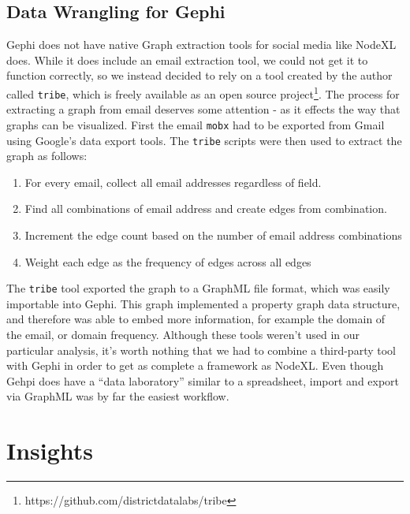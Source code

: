 \documentclass[11pt,letterpaper]{article}
\begin{document}
\subsection*{Data Wrangling for Gephi}

Gephi does not have native Graph extraction tools for social media like NodeXL does. While it does include an email extraction tool, we could not get it to function correctly, so we instead decided to rely on a tool created by the author called \texttt{tribe}, which is freely available as an open source project\footnote{https://github.com/districtdatalabs/tribe}. The process for extracting a graph from email deserves some attention - as it effects the way that graphs can be visualized. First the email \texttt{mobx} had to be exported from Gmail using Google's data export tools. The \texttt{tribe} scripts were then used to extract the graph as follows:

\begin{enumerate}
    \item For every email, collect all email addresses regardless of field.
    \item Find all combinations of email address and create edges from combination.
    \item Increment the edge count based on the number of email address combinations
    \item Weight each edge as the frequency of edges across all edges
\end{enumerate}

The \texttt{tribe} tool exported the graph to a GraphML file format, which was easily importable into Gephi. This graph implemented a property graph data structure, and therefore was able to embed more information, for example the domain of the email, or domain frequency. Although these tools weren't used in our particular analysis, it's worth nothing that we had to combine a third-party tool with Gephi in order to get as complete a framework as NodeXL. Even though Gehpi does have a ``data laboratory'' similar to a spreadsheet, import and export via GraphML was by far the easiest workflow.

\section*{Insights}

\end{document}
